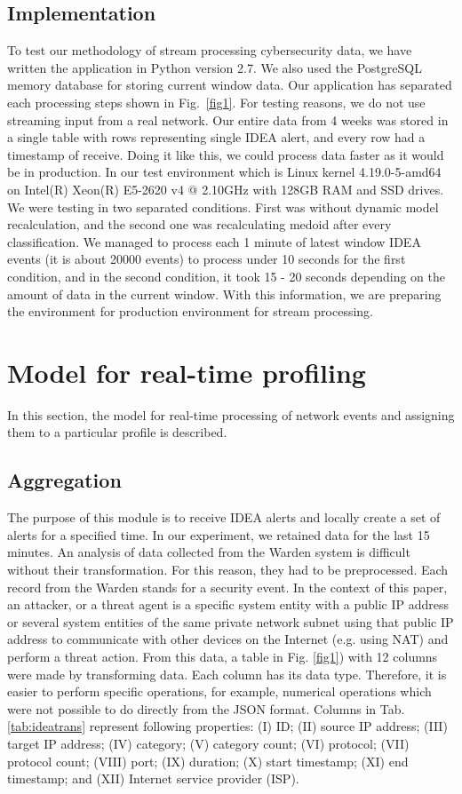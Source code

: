 \documentclass[conference, a4paper]{IEEEtran}
\begin{document}
\subsection{Implementation}
To test our methodology of stream processing cybersecurity data, we have written the application in 
Python version 2.7. We also used the PostgreSQL memory database for storing current window data. Our application has separated each processing steps shown in Fig.~\ref{fig1}. For testing reasons, we do not use streaming input from a real network. Our entire data from 4 weeks was stored in a single table with rows representing single IDEA alert, and every row had a timestamp of receive. Doing it like this, we could process data faster as it would be in production. In our test environment which is Linux kernel 4.19.0-5-amd64 on Intel(R) Xeon(R) E5-2620 v4 @ 2.10GHz with 128GB RAM and SSD drives. We were testing in two separated conditions. First was without dynamic model recalculation, and the second one was recalculating medoid after every classification. We managed to process each 1 minute of latest window IDEA events (it is about 20000 events) to process under 10 seconds for the first condition, and in the second condition, it took 15 - 20 seconds depending on the amount of data in the current window. With this information, we are preparing the environment for production environment for stream processing.

\section{Model for real-time profiling}
In this section, the model for real-time processing of network events and assigning them to a particular profile is described.

\subsection{Aggregation}
The purpose of this module is to receive IDEA alerts and locally create a set of alerts for a specified time. In our experiment, we retained data for the last 15 minutes. An analysis of data collected from the Warden system is difficult without their transformation. For this reason, they had to be preprocessed. Each record from the Warden stands for a security event. In the context of this paper, an attacker, or a threat agent is a specific system entity with a public IP address or several system entities of the same private network subnet using that public IP address to communicate with other devices on the Internet (e.g. using NAT) and perform a threat action. From this data, a table in Fig. \ref{fig1}) with 12 columns were made by transforming data. Each column has its data type. Therefore, it is easier to perform specific operations, for example, numerical operations which were not possible to do directly from the JSON format. Columns in Tab. \ref{tab:ideatrans} represent following properties: (I) ID; (II) source IP address; (III) target IP address; (IV) category; (V) category count; (VI) protocol; (VII) protocol count; (VIII) port; (IX) duration; (X) start timestamp; (XI) end timestamp; and (XII) Internet service provider (ISP). 
\end{document}

